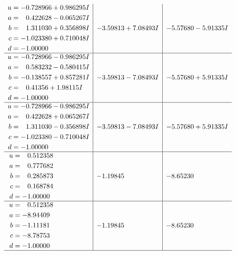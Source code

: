 \documentclass[1p]{elsarticle_modified}
\theoremstyle{definition}
\begin{document}
$$\begin{array}{c|c|c}
\begin{aligned}
u &= -0.728966 + 0.986295 I \\
a &= \phantom{-}0.422628 - 0.065267 I \\
b &= \phantom{-}1.311030 + 0.356898 I \\
c &= -1.023380 + 0.710048 I \\
d &= -1.00000\phantom{ +0.000000I}\end{aligned}
 & -3.59813 + 7.08493 I & -5.57680 - 5.91335 I \\ \hline\begin{aligned}
u &= -0.728966 - 0.986295 I \\
a &= \phantom{-}0.583232 - 0.580415 I \\
b &= -0.138557 + 0.857281 I \\
c &= \phantom{-}0.41356 + 1.98115 I \\
d &= -1.00000\phantom{ +0.000000I}\end{aligned}
 & -3.59813 - 7.08493 I & -5.57680 + 5.91335 I \\ \hline\begin{aligned}
u &= -0.728966 - 0.986295 I \\
a &= \phantom{-}0.422628 + 0.065267 I \\
b &= \phantom{-}1.311030 - 0.356898 I \\
c &= -1.023380 - 0.710048 I \\
d &= -1.00000\phantom{ +0.000000I}\end{aligned}
 & -3.59813 - 7.08493 I & -5.57680 + 5.91335 I \\ \hline\begin{aligned}
u &= \phantom{-}0.512358\phantom{ +0.000000I} \\
a &= \phantom{-}0.777682\phantom{ +0.000000I} \\
b &= \phantom{-}0.285873\phantom{ +0.000000I} \\
c &= \phantom{-}0.168784\phantom{ +0.000000I} \\
d &= -1.00000\phantom{ +0.000000I}\end{aligned}
 & -1.19845\phantom{ +0.000000I} & -8.65230\phantom{ +0.000000I} \\ \hline\begin{aligned}
u &= \phantom{-}0.512358\phantom{ +0.000000I} \\
a &= -8.94409\phantom{ +0.000000I} \\
b &= -1.11181\phantom{ +0.000000I} \\
c &= -8.78753\phantom{ +0.000000I} \\
d &= -1.00000\phantom{ +0.000000I}\end{aligned}
 & -1.19845\phantom{ +0.000000I} & -8.65230\phantom{ +0.000000I}\\
 \hline 
 \end{array}$$\newpage\newpage\renewcommand{\arraystretch}{1}
\end{document}
